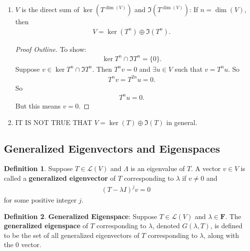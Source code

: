 \documentclass{article}
\theoremstyle{definition}
\newtheorem{defn}{Definition}[section]
\newcommand{\lag}{\mathcal{L}}
\begin{document}
\begin{enumerate}
	\begin{proof}[Proof Outline]
		To show:
		\begin{align*}
		\ker T^n = \ker T^{n+1}.
		\end{align*}
		Suppose this is not true. Then the dimension of the kernel has to increase by at least 1 every step until $n+1$. Thus $\dim \ker T^{n+1} \geq n+1 > n = \dim(V)$. This is a contradiction. 
	\end{proof}
	\item $V$ is the direct sum of $\ker(T^{\dim(V)})$ and $\Im(T^{\dim(V)})$: If $n = \dim(V)$, then
	\begin{align*}
	V = \ker(T^n) \oplus \Im(T^n).
	\end{align*}
	\begin{proof}[Proof Outline]
		To show:
		\begin{align*}
		\ker T^n \cap \Im T^n = \{0 \}. 
		\end{align*}
		Suppose $v\in \ker T^n \cap \Im T^n$. Then $T^n v = 0$ and $\exists u\in V$ such that $v = T^n u$. So
		\begin{align*}
		T^n v = T^{2n}u = 0.
		\end{align*}
		So
		\begin{align*}
		T^n u = 0.
		\end{align*}
		But this means $v = 0$. 
	\end{proof}
	\item IT IS NOT TRUE THAT $V = \ker(T) \oplus \Im(T)$ in general. 
\end{enumerate}

\subsection{Generalized Eigenvectors and Eigenspaces}
\begin{defn}
	Suppose $T\in \lag(V)$ and $\Lambda$ is an eigenvalue of $T$. A vector $v\in V$ is called a \textbf{generalized eigenvector} of $T$ corresponding to $\lambda$ if $v\neq 0$ and
	\begin{align*}
	(T-\lambda I)^j v = 0
	\end{align*}
	for some positive integer $j$. 
\end{defn}

\begin{defn}
	\textbf{Generalized Eigenspace}: Suppose $T \in \lag(V)$ and $\lambda \in \mathbf{F}$. The \textbf{generalized eigenspace} of $T$ corresponding to $\lambda$, denoted $G(\lambda,T)$, is defined to be the set of all generalized eigenvectors of $T$ corresponding to $\lambda$, along with the 0 vector.
\end{defn}
\end{document}
